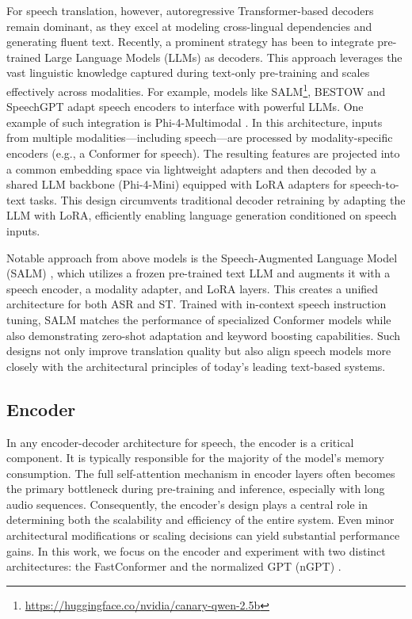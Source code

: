 For speech translation, however, autoregressive Transformer-based decoders remain dominant, as they excel at modeling cross-lingual dependencies and generating fluent text. Recently, a prominent strategy has been to integrate pre-trained Large Language Models (LLMs) as decoders. This approach leverages the vast linguistic knowledge captured during text-only pre-training and scales effectively across modalities. For example, models like SALM\cite{chen2024salm}\footnote{\url{https://huggingface.co/nvidia/canary-qwen-2.5b}}, BESTOW \cite{chen2024bestow} and SpeechGPT \cite{zhang2023speechgpt} adapt speech encoders to interface with powerful LLMs. One example of such integration is Phi-4-Multimodal \cite{abouelenin2025phi4multimodal}. In this architecture, inputs from multiple modalities—including speech—are processed by modality-specific encoders (e.g., a Conformer for speech). The resulting features are projected into a common embedding space via lightweight adapters and then decoded by a shared LLM backbone (Phi-4-Mini) equipped with LoRA adapters for speech-to-text tasks. This design circumvents traditional decoder retraining by adapting the LLM with LoRA, efficiently enabling language generation conditioned on speech inputs.

 Notable approach from above models is the Speech-Augmented Language Model (SALM) \cite{chen2023salm}, which utilizes a frozen pre-trained text LLM and augments it with a speech encoder, a modality adapter, and LoRA layers. This creates a unified architecture for both ASR and ST. Trained with in-context speech instruction tuning, SALM matches the performance of specialized Conformer models while also demonstrating zero-shot adaptation and keyword boosting capabilities. Such designs not only improve translation quality but also align speech models more closely with the architectural principles of today's leading text-based systems.

\subsection{Encoder}
In any encoder-decoder architecture for speech, the encoder is a critical component. It is typically responsible for the majority of the model's memory consumption. The full self-attention mechanism in encoder layers often becomes the primary bottleneck during pre-training and inference, especially with long audio sequences. Consequently, the encoder's design plays a central role in determining both the scalability and efficiency of the entire system. Even minor architectural modifications or scaling decisions can yield substantial performance gains. In this work, we focus on the encoder and experiment with two distinct architectures: the FastConformer \cite{rekesh2023fast} and the normalized GPT (nGPT) \cite{loshchilov2024ngpt}.


